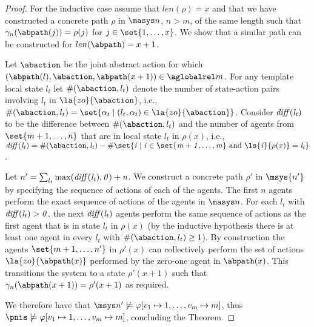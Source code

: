 \begin{proof}
For the inductive case assume that $len(\rho) = x$ and that we have constructed
a concrete path $\rho$ in $\masys n$, $n > m$, of the same length such that
$\gamma_n(\abpath(j)) = \rho(j)$ for $j \in \set{1,\ldots,x}$. We show that a
similar path can be constructed for $len(\abpath) = x+1$.  

Let $\abaction$ be the joint abstract action for which $(\abpath(l), \abaction,
\abpath(x+1)) \in \aglobalrel m$. For any template local state $l_t$ let
$\#(\abaction, l_t)$ denote the number of state-action pairs involving $l_t$ in
$\la{zo}{\abaction}$, i.e., $\#(\abaction, l_t) = \set{\alpha_t \mid (l_t,
\alpha_t) \in \la{zo}{\abaction}}$. Consider $\it{diff}(l_t)$ to be the
difference between $\#(\abaction, l_t)$ and the number of agents from $\set{m+1,
\ldots, n}$ that are in local state $l_t$ in $\rho(x)$, i.e.,  $\it{diff}(l_t) =
\#(\abaction, l_t) - \#\set{i \mid i \in \set{m+1,\ldots,m} \text{ and }
\ls{i}{\rho(x)} = l_t}$. 


Let $n' = \sum_{l_t} \max( \it{diff}(l_t), 0) + n$.  We construct a concrete
path $\rho'$ in $\msys{n'}$ by specifying the sequence of actions of each of the
agents.  The first $n$ agents perform the exact sequence of actions of the
agents in $\masys n$. For each $l_t$ with $\it{diff}(l_t) > 0$, the next
$\it{diff}(l_t)$ agents perform the same sequence of actions as the first agent
that is in state $l_t$ in $\rho(x)$ (by the inductive hypothesis there is at
least one agent in every $l_t$ with $\#(\abaction, l_t) \geq 1$). By
construction the agents $\set{m+1, \ldots, n'}$ in $\rho'(x)$ can collectively
perform the set of actions $\la{zo}{\abpath(x)}$ performed by the zero-one agent
in $\abpath(x)$. This transitions the system to a state $\rho'(x+1)$ such that
$\gamma_n(\abpath(x+1)) = \rho'(x+1)$ as required.

We therefore have that $\msys n'  \not \models \varphi[v_1 \mapsto 1, \ldots,
v_m \mapsto m]$, thus $\pnis \not \models \varphi[v_1 \mapsto 1, \ldots,
v_m \mapsto m]$, concluding the Theorem.

\end{proof}




